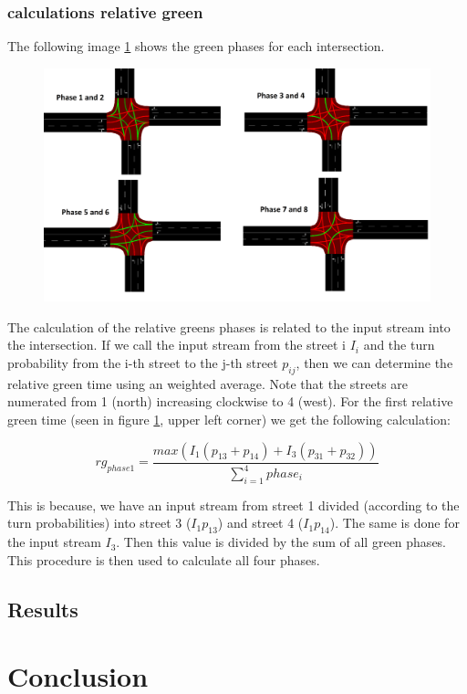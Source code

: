 \documentclass[./\jobname.tex]{subfiles}
\begin{document}
\subsection{calculations relative green}

The following image \ref{fig:greenphases} shows the green phases for each intersection.

\begin{figure}[H]
	\centering
	\includegraphics[width=1\linewidth]{../img/png/cross_phases.png}
	\label{fig:greenphases}
\end{figure}

The calculation of the relative greens phases is related to the input stream into the intersection. If we call the input stream from the street i $I_{i}$ and the turn probability from the i-th street to the j-th street $p_{ij}$, then we can determine the relative green time using an weighted average. Note that the streets are numerated from 1 (north) increasing clockwise to 4 (west). For the first relative green time (seen in figure \ref{fig:greenphases}, upper left corner) we get the following calculation:

\begin{equation}\label{key}
rg_{phase 1} = \frac{max(I_{1}(p_{13} + p_{14})+I_{3}(p_{31}+p_{32}))}{\sum_{i=1}^{4}phase_{i}} 
\end{equation}

This is because, we have an input stream from street 1 divided (according to the turn probabilities) into street 3 ($I_{1}p_{13}$) and street 4 ($I_{1}p_{14}$). The same is done for the input stream $I_{3}$. Then this value is divided by the sum of all green phases. This procedure is then used to calculate all four phases.

\section{Results}

\chapter{Conclusion}
\end{document}
